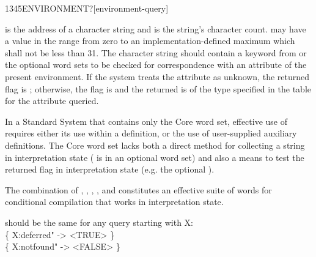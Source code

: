 \begin{worddef}[ENVIRONMENTq]{1345}{ENVIRONMENT?}[environment-query]
\item {}

	 is the address of a character string and 
	is the string's character count.  may have a value in
	the range from zero to an implementation-defined maximum which
	shall not be less than 31. The character string should contain a
	keyword from  or the
	optional word sets to be checked for correspondence with an
	attribute of the present environment. If the system treats the
	attribute as unknown, the returned flag is ;
	otherwise, the flag is  and the  returned
	is of the type specified in the table for the attribute queried.

	\begin{defer}
	\rationale %
		In a Standard System that contains only the Core word set,
		effective use of  requires either its use
		within a definition, or the use of user-supplied auxiliary
		definitions. The Core word set lacks both a direct method for
		collecting a string in interpretation state (
		is in an optional word set) and also a means to test the
		returned flag in interpretation state (e.g. the optional
		).

		The combination of
		,
		,
		,
		, and
		constitutes an effective suite of words for conditional
		compilation that works in interpretation state.

	\testing
		 should be the same for any query starting with X: \\
		\{  X:deferred"      -> <TRUE> \} \\
		\{  X:notfound"      -> <FALSE> \}
	\end{defer}
\end{worddef}



